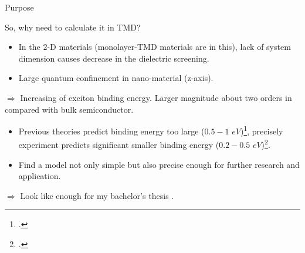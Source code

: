 \documentclass{beamer}
\begin{document}
\begin{frame}{Purpose}
\begin{center}
	So, why need to calculate it in TMD?
\end{center}
\begin{itemize}
\item In the 2-D materials (monolayer-TMD materials are in this), lack of system dimension causes decrease in the dielectric screening.
\item Large quantum confinement in nano-material (z-axis).
\end{itemize}
$\Rightarrow$ Increasing of exciton binding energy. Larger magnitude about two orders in compared with bulk semiconductor.\\
\begin{itemize}
\item Previous theories predict binding energy too large ($0.5-1$ \(eV\))\footcite{ramasubramaniam_large_2012,qiu_optical_2013}, precisely experiment predicts significant smaller binding energy ($0.2-0.5$ \(eV\))\footcite{zhang_absorption_2014}.
\item Find a model not only simple but also precise enough for further research and application.
\end{itemize}
$\Rightarrow$ Look like enough for my bachelor's thesis \smiley{}.
\end{frame}
\end{document}
